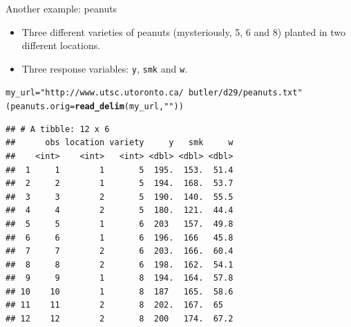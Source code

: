 \documentclass[unknownkeysallowed]{beamer}\usepackage[]{graphicx}\usepackage[]{color}
\makeatletter
\newcommand{\hlstr}[1]{\textcolor[rgb]{0.192,0.494,0.8}{#1}}%
\newcommand{\hlopt}[1]{\textcolor[rgb]{0,0,0}{#1}}%
\newcommand{\hlstd}[1]{\textcolor[rgb]{0.345,0.345,0.345}{#1}}%
\newcommand{\hlkwb}[1]{\textcolor[rgb]{0.69,0.353,0.396}{#1}}%
\newcommand{\hlkwc}[1]{\textcolor[rgb]{0.333,0.667,0.333}{#1}}%
\newcommand{\hlkwd}[1]{\textcolor[rgb]{0.737,0.353,0.396}{\textbf{#1}}}%
\newenvironment{kframe}{%
 \def\at@end@of@kframe{}%
 \ifinner\ifhmode%
  \def\at@end@of@kframe{\end{minipage}}%
  \begin{minipage}{\columnwidth}%
 \fi\fi%
 \def\FrameCommand##1{\hskip\@totalleftmargin \hskip-\fboxsep
 \colorbox{shadecolor}{##1}\hskip-\fboxsep
     \hskip-\linewidth \hskip-\@totalleftmargin \hskip\columnwidth}%
 \MakeFramed {\advance\hsize-\width
   \@totalleftmargin\z@ \linewidth\hsize
   \@setminipage}}%
 {\par\unskip\endMakeFramed%
 \at@end@of@kframe}
\newenvironment{knitrout}{}{} %
\makeatother
\begin{document}
\begin{frame}[fragile]{Another example: peanuts}

  \begin{itemize}
  \item  Three different varieties
of peanuts (mysteriously, 5, 6 and 8) planted in two different
locations.
\item Three response variables: \texttt{y}, \texttt{smk} and
\texttt{w}.
  \end{itemize}

 
\begin{knitrout}\footnotesize
{}\color{fgcolor}\begin{kframe}
\begin{alltt}
\hlstd{my_url}\hlkwb{=}\hlstr{"http://www.utsc.utoronto.ca/~butler/d29/peanuts.txt"}
\hlstd{(peanuts.orig}\hlkwb{=}\hlkwd{read_delim}\hlstd{(my_url,}\hlstr{" "}\hlstd{))}
\end{alltt}
\begin{verbatim}
## # A tibble: 12 x 6
##      obs location variety     y   smk     w
##    <int>    <int>   <int> <dbl> <dbl> <dbl>
##  1     1        1       5  195.  153.  51.4
##  2     2        1       5  194.  168.  53.7
##  3     3        2       5  190.  140.  55.5
##  4     4        2       5  180.  121.  44.4
##  5     5        1       6  203   157.  49.8
##  6     6        1       6  196.  166   45.8
##  7     7        2       6  203.  166.  60.4
##  8     8        2       6  198.  162.  54.1
##  9     9        1       8  194.  164.  57.8
## 10    10        1       8  187   165.  58.6
## 11    11        2       8  202.  167.  65  
## 12    12        2       8  200   174.  67.2
\end{verbatim}
\end{kframe}
\end{knitrout}
    
    
\end{frame}

\end{document}
